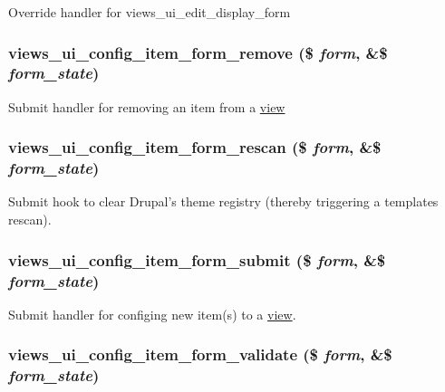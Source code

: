 Override handler for views\_\-ui\_\-edit\_\-display\_\-form \hypertarget{admin_8inc_7f602db6d4cc41b412a8ace2d6320ea8}{
\subsubsection[{views\_\-ui\_\-config\_\-item\_\-form\_\-remove}]{\setlength{\rightskip}{0pt plus 5cm}views\_\-ui\_\-config\_\-item\_\-form\_\-remove (\$ {\em form}, \/  \&\$ {\em form\_\-state})}}
\label{admin_8inc_7f602db6d4cc41b412a8ace2d6320ea8}


Submit handler for removing an item from a \hyperlink{classview}{view} \hypertarget{admin_8inc_2f6df8066d61dc4f84b6bdbfffc70c1c}{
\subsubsection[{views\_\-ui\_\-config\_\-item\_\-form\_\-rescan}]{\setlength{\rightskip}{0pt plus 5cm}views\_\-ui\_\-config\_\-item\_\-form\_\-rescan (\$ {\em form}, \/  \&\$ {\em form\_\-state})}}
\label{admin_8inc_2f6df8066d61dc4f84b6bdbfffc70c1c}


Submit hook to clear Drupal's theme registry (thereby triggering a templates rescan). \hypertarget{admin_8inc_f158b94f2b2f0886fde847d3f378c8ed}{
\subsubsection[{views\_\-ui\_\-config\_\-item\_\-form\_\-submit}]{\setlength{\rightskip}{0pt plus 5cm}views\_\-ui\_\-config\_\-item\_\-form\_\-submit (\$ {\em form}, \/  \&\$ {\em form\_\-state})}}
\label{admin_8inc_f158b94f2b2f0886fde847d3f378c8ed}


Submit handler for configing new item(s) to a \hyperlink{classview}{view}. \hypertarget{admin_8inc_023993084cf3409a55a8831df1d0935b}{
\subsubsection[{views\_\-ui\_\-config\_\-item\_\-form\_\-validate}]{\setlength{\rightskip}{0pt plus 5cm}views\_\-ui\_\-config\_\-item\_\-form\_\-validate (\$ {\em form}, \/  \&\$ {\em form\_\-state})}}
\label{admin_8inc_023993084cf3409a55a8831df1d0935b}


